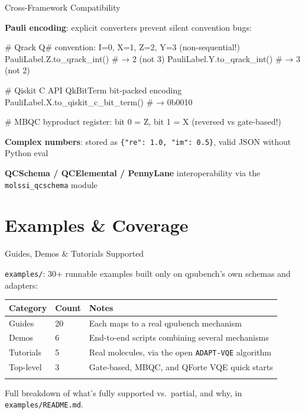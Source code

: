 \documentclass[
  ignorenonframetext,
  aspectratio=169,
]{beamer}
\newenvironment{Shaded}{\begin{snugshade}}{\end{snugshade}}
\newcommand{\CommentTok}[1]{\textcolor[rgb]{0.48,0.49,0.49}{#1}}
\newcommand{\NormalTok}[1]{\textcolor[rgb]{0.81,0.81,0.76}{#1}}
\begin{document}
\begin{frame}[fragile]{Cross-Framework Compatibility}
\label{cross-framework-compatibility}
\footnotesize

\textbf{Pauli encoding}: explicit converters prevent silent convention
bugs:

\begin{Shaded}
\begin{Highlighting}[]
\CommentTok{\# Qrack Q\# convention: I=0, X=1, Z=2, Y=3  (non{-}sequential!)}
\NormalTok{PauliLabel.Z.to\_qrack\_int()           }\CommentTok{\# → 2  (not 3)}
\NormalTok{PauliLabel.Y.to\_qrack\_int()           }\CommentTok{\# → 3  (not 2)}

\CommentTok{\# Qiskit C API QkBitTerm bit{-}packed encoding}
\NormalTok{PauliLabel.X.to\_qiskit\_c\_bit\_term()   }\CommentTok{\# → 0b0010}

\CommentTok{\# MBQC byproduct register: bit 0 = Z, bit 1 = X  (reversed vs gate{-}based!)}
\end{Highlighting}
\end{Shaded}

\textbf{Complex numbers}: stored as
\texttt{\{"re":\ 1.0,\ "im":\ 0.5\}}, valid JSON without Python eval

\textbf{QCSchema / QCElemental / PennyLane} interoperability via the
\texttt{molssi\_qcschema} module \normalsize
\end{frame}

\section{Examples \& Coverage}\label{examples-coverage}

\begin{frame}[fragile]{Guides, Demos \& Tutorials Supported}
\label{guides-demos-tutorials-supported}
\footnotesize

\texttt{examples/}: 30+ runnable examples built only on qpubench's own
schemas and adapters:

\begin{longtable}[]{@{}lll@{}}
\toprule\noalign{}
Category & Count & Notes \\
\midrule\noalign{}
\endhead
Guides & 20 & Each maps to a real qpubench mechanism \\
Demos & 6 & End-to-end scripts combining several mechanisms \\
Tutorials & 5 & Real molecules, via the open \texttt{ADAPT-VQE}
algorithm \\
Top-level & 3 & Gate-based, MBQC, and QForte VQE quick starts \\
\bottomrule\noalign{}
\end{longtable}

Full breakdown of what's fully supported vs.~partial, and why, in
\texttt{examples/README.md}. \normalsize
\end{frame}
\end{document}
